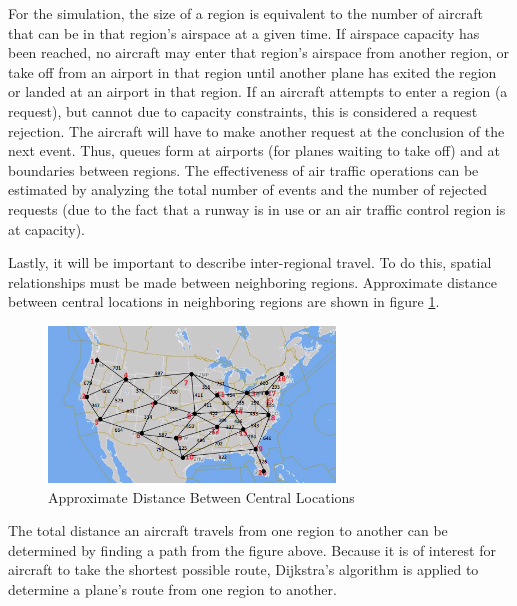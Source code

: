 For the simulation, the size of a region is equivalent to the number of aircraft that can be in
that region’s airspace at a given time. If airspace capacity has been reached, no aircraft may
enter that region’s airspace from another region, or take off from an airport in that region until
another plane has exited the region or landed at an airport in that region. If an aircraft attempts
to enter a region (a request), but cannot due to capacity constraints, this is considered a
request rejection. The aircraft will have to make another request at the conclusion of the next
event. Thus, queues form at airports (for planes waiting to take off) and at boundaries between
regions. The effectiveness of air traffic operations can be estimated by analyzing the total
number of events and the number of rejected requests (due to the fact that a runway is in use or
an air traffic control region is at capacity).

Lastly, it will be important to describe inter-regional travel. To do this, spatial relationships must
be made between neighboring regions. Approximate distance between central locations in
neighboring regions are shown in figure \ref{fig:approx_dist}.

\begin{figure} [htb]
\centering
\includegraphics[width=3in]{figs/map_graph.png}
\caption{Approximate Distance Between Central Locations}
\label{fig:approx_dist}
\end{figure}

The total distance an aircraft travels from one region to another can be determined by finding
a path from the figure above. Because it is of interest for aircraft to take the shortest possible
route, Dijkstra’s algorithm is applied to determine a plane’s route from one region to another.


